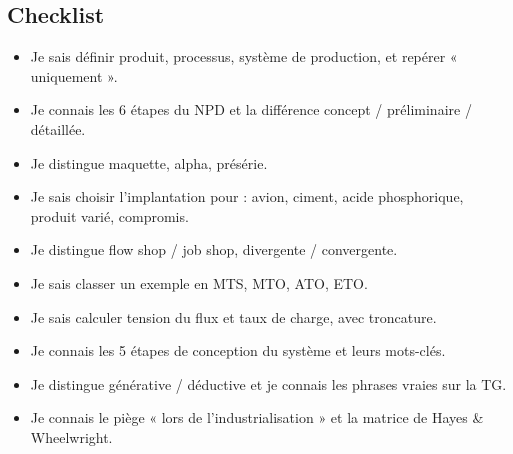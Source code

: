 \documentclass[11pt,a4paper]{article}
\begin{document}
\subsection*{Checklist}
\begin{itemize}[label=$\square$]
\item Je sais définir produit, processus, système de production, et repérer « uniquement ».
\item Je connais les 6 étapes du NPD et la différence concept / préliminaire / détaillée.
\item Je distingue maquette, alpha, présérie.
\item Je sais choisir l'implantation pour : avion, ciment, acide phosphorique, produit varié, compromis.
\item Je distingue flow shop / job shop, divergente / convergente.
\item Je sais classer un exemple en MTS, MTO, ATO, ETO.
\item Je sais calculer tension du flux et taux de charge, avec troncature.
\item Je connais les 5 étapes de conception du système et leurs mots-clés.
\item Je distingue générative / déductive et je connais les phrases vraies sur la TG.
\item Je connais le piège « lors de l'industrialisation » et la matrice de Hayes \& Wheelwright.
\end{itemize}
\end{document}
